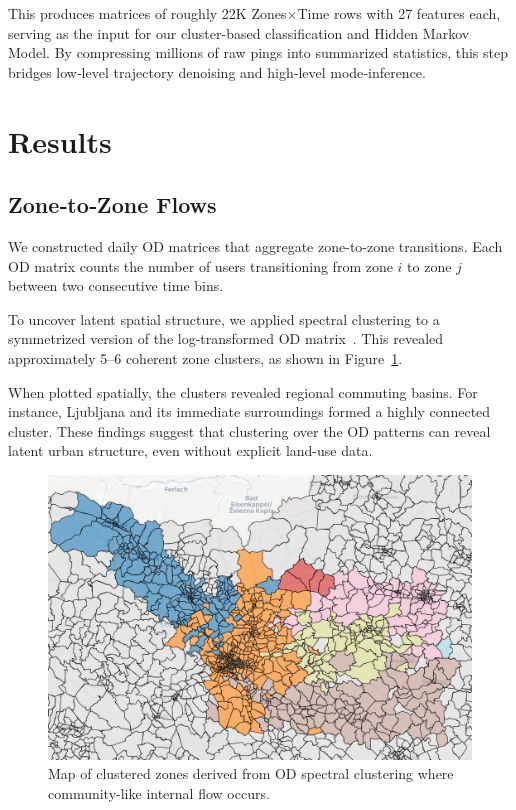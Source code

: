 \documentclass[fleqn,moreauthors,10pt]{ds_report}
\begin{document}
This produces matrices of roughly 22K Zones$\times$Time rows with 27 features each, serving as the input for our cluster-based classification and Hidden Markov Model. By compressing millions of raw pings into summarized statistics, this step bridges low‐level trajectory denoising and high‐level mode‐inference.

\section*{Results}

\subsection*{Zone‐to‐Zone Flows}
We constructed daily OD matrices that aggregate zone-to-zone transitions. Each OD matrix counts the number of users transitioning from zone $i$ to zone $j$ between two consecutive time bins.

To uncover latent spatial structure, we applied spectral clustering to a symmetrized version of the log-transformed OD matrix~\cite{louail2015spatial}. This revealed approximately 5–6 coherent zone clusters, as shown in Figure~\ref{fig:cluster_map}.


When plotted spatially, the clusters revealed regional commuting basins. For instance, Ljubljana and its immediate surroundings formed a highly connected cluster. These findings suggest that clustering over the OD patterns can reveal latent urban structure, even without explicit land-use data.

\begin{figure}[ht]
  \centering
  \includegraphics[width=0.85\linewidth]{fig/cluster_map.pdf}
  \caption{Map of clustered zones derived from OD spectral clustering where community-like internal flow occurs.}
  \label{fig:cluster_map}
\end{figure}
\end{document}
